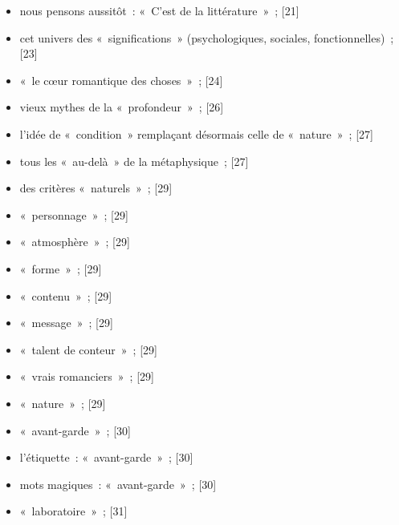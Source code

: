 \documentclass[12pt, a4paper]{article}
\begin{document}
\begin{itemize}
    \item nous pensons aussitôt~: «~C’est de la littérature~»{\color{gray}~; [21]}

    \item cet univers des «~significations~» (psychologiques, sociales, fonctionnelles){\color{gray}~; [23]}

    \item «~le cœur romantique des choses~»{\color{gray}~; [24]}

    \item vieux mythes de la «~profondeur~»{\color{gray}~; [26]}

    \item  l’idée de «~condition~» remplaçant désormais celle de «~nature~»{\color{gray}~; [27]}

    \item tous les «~au-delà~» de la métaphysique{\color{gray}~; [27]}

    \item des critères «~naturels~»{\color{gray}~; [29]}

    \item «~personnage~»{\color{gray}~; [29]}

    \item «~atmosphère~»{\color{gray}~; [29]}

    \item «~forme~»{\color{gray}~; [29]}

    \item «~contenu~»{\color{gray}~; [29]}

    \item «~message~»{\color{gray}~; [29]}

    \item «~talent de conteur~»{\color{gray}~; [29]}

    \item «~vrais romanciers~»{\color{gray}~; [29]}

    \item «~nature~»{\color{gray}~; [29]}

    \item «~avant-garde~»{\color{gray}~; [30]}

    \item l’étiquette~: «~avant-garde~»{\color{gray}~; [30]}

    \item mots magiques~: «~avant-garde~»{\color{gray}~; [30]}

    \item «~laboratoire~»{\color{gray}~; [31]}


\end{itemize}
\end{document}
